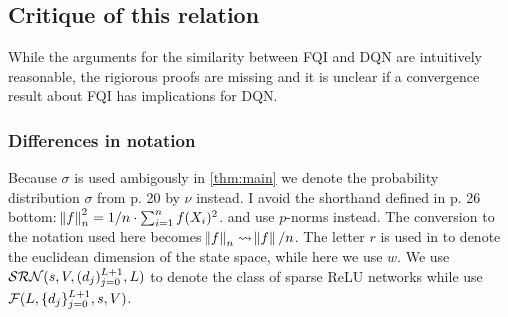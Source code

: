 \subsection{Critique of this relation}

While the arguments for the similarity between FQI and DQN are intuitively
reasonable, the rigiorous proofs are missing and it is unclear if
a convergence result about FQI has implications for DQN.

\subsubsection{Differences in notation}

Because $\sigma$ is used ambigously in \cref{thm:main}
we denote the probability distribution $\sigma$
from  p. 20 by $\nu$ instead.
I avoid the shorthand defined in
 p. 26 bottom:
$\norm{f}_n^2 = 1/n \cdot \sum_{i=1}^n f(X_i)^2$.
and use $p$-norms instead.
The conversion to the notation used here becomes
$\norm{f}_n \leadsto \norm{f}/n$.
The letter $r$ is used in  to denote the euclidean dimension of
the state space, while here we use $w$.
We use $\mathcal{SRN}(s, V, (d_j)_{j=0}^{L+1}, L)$
  to denote the class of sparse ReLU networks while
 use $\mathcal{F}(L, \{d_j\}_{j=0}^{L+1}, s, V)$.

